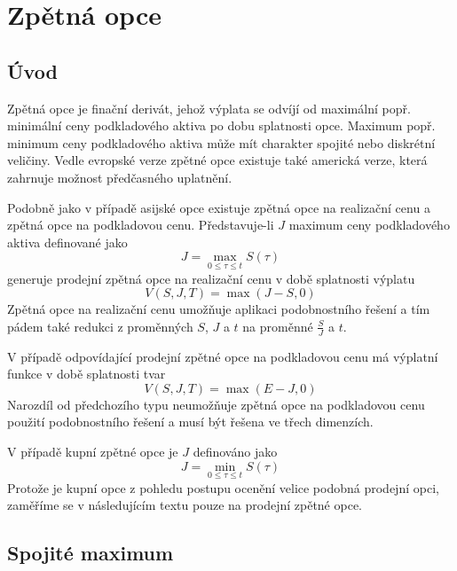 \documentclass[a4paper]{book}
\begin{document}
\chapter{Zpětná opce}

\section{Úvod}

Zpětná opce je finační derivát, jehož výplata se odvíjí od maximální popř. minimální ceny podkladového aktiva po dobu splatnosti opce. Maximum popř. minimum ceny podkladového aktiva může mít charakter spojité nebo diskrétní veličiny. Vedle evropské verze zpětné opce existuje také americká verze, která zahrnuje možnost předčasného uplatnění.

Podobně jako v případě asijské opce existuje zpětná opce na realizační cenu a zpětná opce na podkladovou cenu. Představuje-li $J$ maximum ceny podkladového aktiva definované jako
\begin{equation*}
J = \underset{0 \le \tau \le t}\max S(\tau)
\end{equation*}
generuje prodejní zpětná opce na realizační cenu v době splatnosti výplatu
\begin{equation*}
V(S,J,T) = \max(J - S, 0)
\end{equation*}
Zpětná opce na realizační cenu umožňuje aplikaci podobnostního řešení a tím pádem také redukci z proměnných $S$, $J$ a $t$ na proměnné $\frac{S}{J}$ a $t$.

V případě odpovídající prodejní zpětné opce na podkladovou cenu má výplatní funkce v době splatnosti tvar
\begin{equation*}
V(S,J,T) = \max(E - J, 0)
\end{equation*}
Narozdíl od předchozího typu neumožňuje zpětná opce na podkladovou cenu použití podobnostního řešení a musí být řešena ve třech dimenzích.

V případě kupní zpětné opce je $J$ definováno jako
\begin{equation*}
J = \underset{0 \le \tau \le t}\min S(\tau)
\end{equation*}
Protože je kupní opce z pohledu postupu ocenění velice podobná prodejní opci, zaměříme se v následujícím textu pouze na prodejní zpětné opce.

\section{Spojité maximum}
\end{document}

